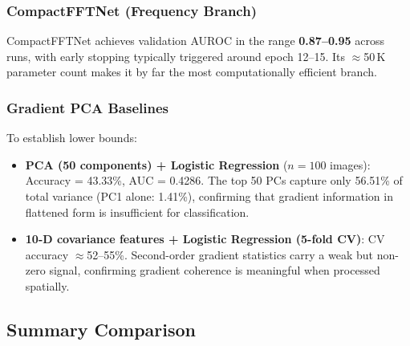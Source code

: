 \documentclass[12pt, a4paper]{article}
\begin{document}
\subsubsection{CompactFFTNet (Frequency Branch)}

CompactFFTNet achieves validation AUROC in the range \textbf{0.87–0.95} across
runs, with early stopping typically triggered around epoch 12–15.  Its
$\approx$50\,K parameter count makes it by far the most computationally efficient
branch.

\subsubsection{Gradient PCA Baselines}

To establish lower bounds:
\begin{itemize}[leftmargin=*]
  \item \textbf{PCA (50 components) + Logistic Regression} ($n=100$ images):
        Accuracy = 43.33\%, AUC = 0.4286.
        The top 50 PCs capture only 56.51\% of total variance (PC1 alone: 1.41\%),
        confirming that gradient information in flattened form is insufficient for
        classification.
  \item \textbf{10-D covariance features + Logistic Regression (5-fold CV)}:
        CV accuracy $\approx$52–55\%.  Second-order gradient statistics carry
        a weak but non-zero signal, confirming gradient coherence is meaningful
        when processed spatially.
\end{itemize}

\subsection{Summary Comparison}
\label{sec:summary}
\end{document}
